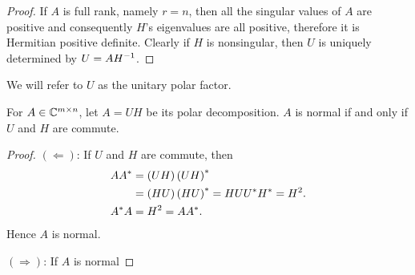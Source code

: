 \documentclass[12pt]{article}
\begin{document}
\begin{proof}
    If $A$ is full rank, namely $r = n$, then all the singular values of $A$ are positive and consequently $H$'s eigenvalues are all positive, therefore it is Hermitian positive definite. Clearly if $H$ is nonsingular, then $U$ is uniquely determined by $U = AH^{-1}$.
\end{proof}

We will refer to $U$ as the unitary polar factor.

\begin{theorem}
    For $A\in\mathbb{C}^{m\times n}$, let $A = UH$ be its polar decomposition. $A$ is normal if and only if $U$ and $H$ are commute.
\end{theorem}

\begin{proof}
    $(\Leftarrow)$: If $U$ and $H$ are commute, then 
    \begin{equation}
        \notag
        \begin{aligned}
            AA^* &= \left(UH\right)\left(UH\right)^*\\
                & = \left(HU\right)\left(HU\right)^* = HUU^* H^* = H^2. \\
            A^* A & = H^2 = AA^*.
        \end{aligned}
    \end{equation}
    Hence $A$ is normal.

    $(\Rightarrow)$: If $A$ is normal
\end{proof}




\newpage 
\nocite{*}


\end{document}
